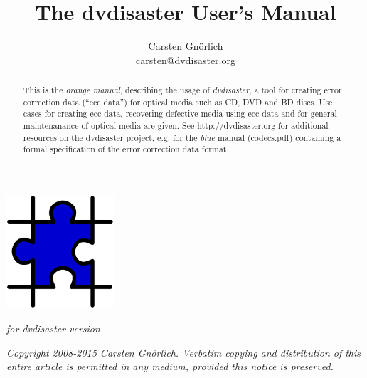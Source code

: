 \documentclass[12pt,a4paper,twoside]{article}
\newcommand{\paperversion}{{\em for dvdisaster version \projectversion}}
\begin{document}
\pagecolor{lightorange}
\title{The dvdisaster User's Manual}
\author{Carsten Gnörlich\\carsten@dvdisaster.org}
\date{}
\maketitle
\thispagestyle{empty}

\centerline{\includegraphics[width=40mm]{figures/puzzle.pdf}}

\begin{center}
\paperversion
\end{center}

\bigskip

\begin{abstract}
This is the {\em orange manual}, describing the usage of {\em dvdisaster}, a tool for
creating error correction data (``ecc data'') 
for optical media  such as CD, DVD and BD discs. 
Use cases for creating ecc data, recovering defective media
using ecc data and for general maintenanance of optical 
media are given. 
See \url{http://dvdisaster.org}  for additional resources on
the dvdisaster project, e.g. for the {\em blue} manual (codecs.pdf)
containing a formal specification of the error correction data format.
\end{abstract}

\vfill
\begin{center}
{\em 
Copyright 2008-2015 Carsten Gnörlich.
Verbatim copying and distribution of this entire article is permitted in any medium, 
provided this notice is preserved.}
\end{center}

\newpage
\nopagecolor


\tableofcontents
\newpage


\newpage


\newpage


\newpage


\newpage


\newpage


\newpage


\newpage



\label{LastPage}\label{missing}
\end{document}

